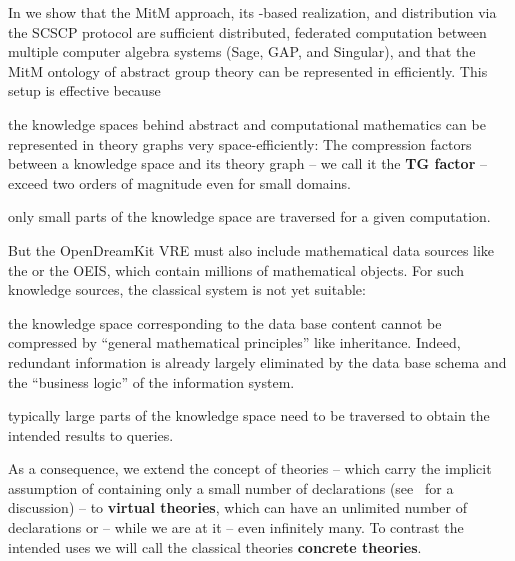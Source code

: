 In \cite{KohMuePfe:kbimss17} we show that the MitM approach, its \ommt-based realization,
and distribution via the SCSCP protocol are sufficient distributed, federated computation
between multiple computer algebra systems (Sage, GAP, and Singular), and that the MitM
ontology of abstract group theory can be represented in \ommt efficiently. This setup is
effective because
\begin{compactenum}[\bf C1]
\item the knowledge spaces behind abstract and computational mathematics can be
  represented in theory graphs very space-efficiently: The compression factors between a
  knowledge space and its theory graph -- we call it the \textbf{TG factor} --
  exceed two orders of magnitude even for small domains.
\item only small parts of the knowledge space are traversed for a given computation. 
\end{compactenum}

But the OpenDreamKit VRE must also include mathematical data sources like the \lmfdb or
the OEIS, which contain millions of mathematical objects. For such knowledge sources, the
classical \mmt system is not yet suitable: 
\begin{compactenum}[\bf V1]
\item the knowledge space corresponding to the data base content cannot be compressed by
  ``general mathematical principles'' like inheritance. Indeed, redundant information is
  already largely eliminated by the data base schema and the ``business logic'' of the
  information system.
\item typically large parts of the knowledge space need to be traversed to obtain the
  intended results to queries.
\end{compactenum}
As a consequence, we extend the concept of \ommt theories -- which carry the implicit
assumption of containing only a small number of declarations (see~\cite{FaGu:lt92} for a
discussion) -- to \textbf{virtual theories}, which can have an unlimited number of
declarations or -- while we are at it -- even infinitely many. To contrast the intended
uses we will call the classical \ommt theories \textbf{concrete theories}. 


